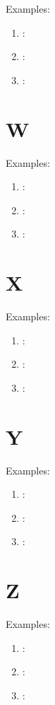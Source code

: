 Examples:
\begin{enumerate}
    \item \textbf{}: \textipa{[]}
    \item \textbf{}: \textipa{[]}
    \item \textbf{}: \textipa{[]}
\end{enumerate}

\section*{W}

Examples:
\begin{enumerate}
    \item \textbf{}: \textipa{[]}
    \item \textbf{}: \textipa{[]}
    \item \textbf{}: \textipa{[]}
\end{enumerate}

\section*{X}

Examples:
\begin{enumerate}
    \item \textbf{}: \textipa{[]}
    \item \textbf{}: \textipa{[]}
    \item \textbf{}: \textipa{[]}
\end{enumerate}

\section*{Y}

Examples:
\begin{enumerate}
    \item \textbf{}: \textipa{[]}
    \item \textbf{}: \textipa{[]}
    \item \textbf{}: \textipa{[]}
\end{enumerate}

\section*{Z}

Examples:
\begin{enumerate}
    \item \textbf{}: \textipa{[]}
    \item \textbf{}: \textipa{[]}
    \item \textbf{}: \textipa{[]}
\end{enumerate}

